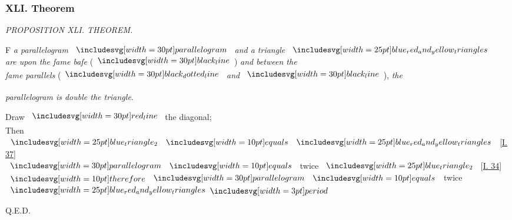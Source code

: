 \documentclass[12pt,preview]{standalone}
\begin{document}
\subsubsection{XLI. Theorem}

\begin{minipage}[t]{0.33\textwidth}
    \vspace{40pt}
    
\end{minipage}%
\hfill
\begin{minipage}[t]{0.64\textwidth}
    \vspace{0pt}

    \begin{center}
        \textit{PROPOSITION XLI. THEOREM.}\label{book1pr41} \\
    \end{center}

    \hfill

    \begin{center}
        \raggedright \lettrine[lines=4, loversize=1, nindent=0pt]{}{}F \textit{a parallelogram} $\img[0][0][30]{parallelogram}$ \textit{and a triangle} $\img{blue_red_and_yellow_triangles}$\\ \textit{are upon the ſame baſe} (\hspace{-1ex}$\blackline$\hspace{-1ex}) \textit{and between the\\ ſame parallels} (\hspace{-1ex}$\dottedblackline$ \textit{and} $\blackline$\hspace{-1ex}), \textit{the}\\
    \end{center}
    \textit{parallelogram is double the triangle}.

    \hfill

    \hfill

    \begin{center}
        Draw $\redline$ the diagonal;\\
        Then $\img{blue_triangle_2} \bequals \img{blue_red_and_yellow_triangles}$ [\hyperref[book1pr37]{\textsc{I.} 37}]\\
        $\img[0][0][30]{parallelogram} \bequals$ twice $\img{blue_triangle_2}$ [\hyperref[book1pr34]{\textsc{I.} 34}]\\
        $\btherefore \img[0][0][30]{parallelogram} \bequals$ twice $\img{blue_red_and_yellow_triangles} \bperiod$
    \end{center}

    \hfill

    \hfill Q.E.D.
\end{minipage}
\end{document}
